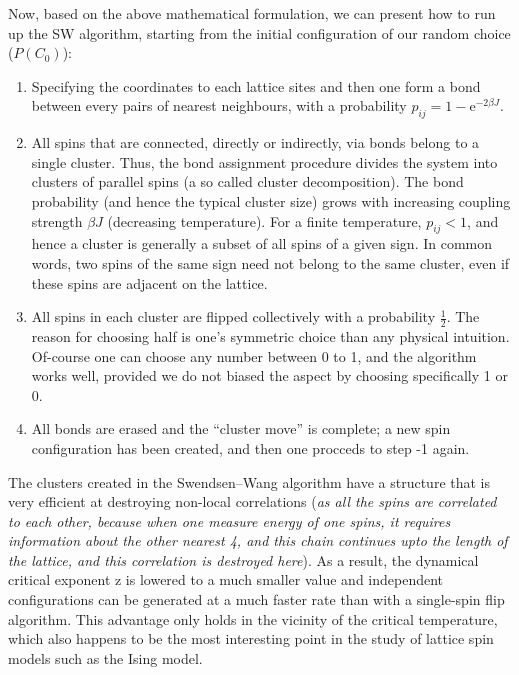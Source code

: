 \documentclass[a4paper,8pt]{article}
\begin{document}
\vspace{0.3cm}
Now, based on the above mathematical formulation, we can present how to run up the SW algorithm, starting from the initial configuration of our random choice ($P(C_0)$): 
\begin{enumerate}
    \item Specifying the coordinates to each lattice sites and then one form a bond between every pairs of nearest neighbours, with a probability $p_{ij} = 1 - \mathrm{e}^{-2 \beta J}$.
    
    \item All spins that are connected, directly or indirectly, via bonds belong to a single cluster. Thus, the bond assignment procedure divides the system into clusters of parallel spins (a so called cluster decomposition). The bond probability (and hence the typical cluster size) grows with increasing coupling strength $\beta J$ (decreasing temperature). For a finite temperature, $p_{ij} < 1$, and hence a cluster is generally a subset of all spins of a given sign. In common words, two spins of the same sign need not belong to the same cluster, even if these spins are adjacent on the lattice.
    
    \item All spins in each cluster are flipped collectively with a probability $\frac{1}{2}$. The reason for choosing half is one's symmetric choice than any physical intuition. Of-course one can choose any number between 0 to 1, and the algorithm works well, provided we do not biased the aspect by choosing specifically 1 or 0. 
    
    \item All bonds are erased and the “cluster move” is complete; a new spin configuration has been created, and then one procceds to step -1 again. 
    
\end{enumerate}
The clusters created in the Swendsen–Wang algorithm have a structure that is very efficient at destroying non-local correlations (\textit{as all the spins are correlated to each other, because when one measure energy of one spins, it requires information about the other nearest 4, and this chain continues upto the length of the lattice, and this correlation is destroyed here}). As a result, the dynamical critical exponent z is lowered to a much smaller value and independent configurations can be generated at a much faster rate than with a single-spin flip algorithm. This advantage only holds in the vicinity of the critical temperature,
which also happens to be the most interesting point in the study of lattice spin models such as the Ising model. \\
\end{document}
